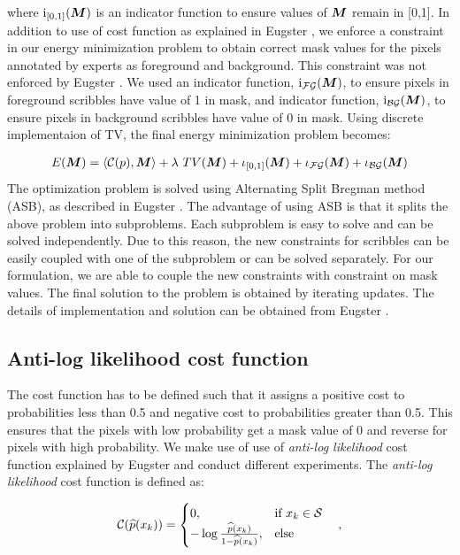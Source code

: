 where $\mathrm{i}_{[0,1]}(\boldsymbol{M})$ is an indicator function to ensure values of $\boldsymbol{M}$ remain in [0,1]. In addition to use of cost function as explained in Eugster \cite{dominic}, we enforce a constraint in our energy minimization problem to obtain correct mask values for the pixels annotated by experts as foreground and background. This constraint was not enforced by Eugster \cite{dominic}. We used an indicator function, $\mathrm{i}_{\mathcal{FG}}(\boldsymbol{M})$, to ensure pixels in foreground scribbles have value of 1 in mask, and indicator function, $\mathrm{i}_{\mathcal{BG}}(\boldsymbol{M})$, to ensure pixels in background scribbles have value of 0 in mask. Using discrete implementaion of TV, the final energy minimization problem becomes:

\begin{align}
\mathop{{}E}(\boldsymbol{M}) = \langle\mathcal{C}(p), \boldsymbol{M}\rangle + \lambda\, \mathop{{}TV}(\boldsymbol{M}) + \iota_{[0,1]}(\boldsymbol{M}) + \iota_{\mathcal{FG}}(\boldsymbol{M})  + \iota_{\mathcal{BG}}(\boldsymbol{M}) 
\end{align}
The optimization problem is solved using Alternating Split Bregman method (ASB), as described in Eugster \cite{dominic}. The advantage of using ASB is that it splits the above problem into subproblems. Each subproblem is easy to solve and can be solved independently. Due to this reason, the new constraints for scribbles can be easily coupled with one of the subproblem or can be solved separately. For our formulation, we are able to couple the new constraints with constraint on mask values. The final solution to the problem is obtained by iterating updates. The details of implementation and solution can be obtained from Eugster \cite{dominic}. 


\subsection{Anti-log likelihood cost function}
The cost function has to be defined such that it assigns a positive cost to probabilities less than 0.5 and negative cost to probabilities greater than 0.5. This ensures that the pixels with low probability get a mask value of 0 and reverse for pixels with high probability. We make use of use of \textit{anti-log likelihood} cost function explained by Eugster \cite{dominic} and conduct different experiments. The \textit{anti-log likelihood} cost function is defined as:

\begin{align*}
\mathcal{C}(\widehat{p}(x_{k})) =
\begin{cases}
  0, & \text{if}\ x_k \in \mathcal{S}  \\
  -\log \frac{\widehat{p}(x_{k})}{1-\widehat{p}(x_{k})}, & \text{else} 
\end{cases} \quad ,
\end{align*} 

